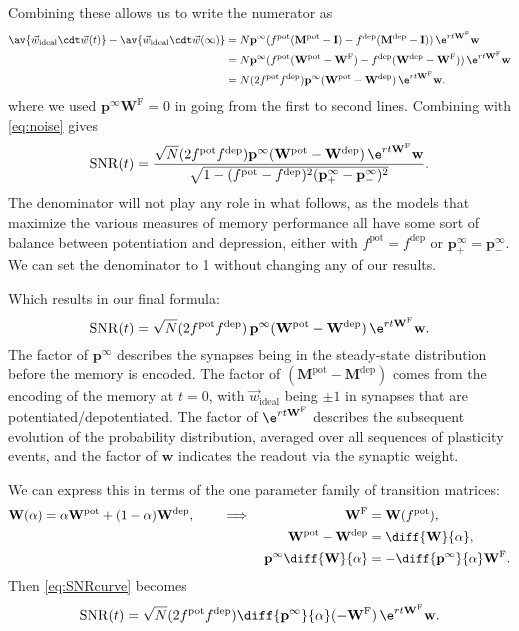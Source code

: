 \documentclass{article} %
\DeclareMathOperator{\SNR}{SNR}
\newcommand{\wv}{\vec{w}}
\newcommand{\wvi}{\vec{w}_\text{ideal}}
\newcommand{\I}{\mathbf{I}}
\newcommand{\pr}{\mathbf{p}}
\newcommand{\eq}{\pr^\infty}
\newcommand{\w}{\mathbf{w}}
\newcommand{\W}{\mathbf{W}}
\newcommand{\M}{\mathbf{M}}
\newcommand{\frg}{\W^{\mathrm{F}}}
\newcommand{\pot}{^{\text{pot}}}
\newcommand{\dep}{^{\text{dep}}}
\begin{document}
Combining these allows us to write the numerator as
%
\begin{equation}\label{eq:signal}
\begin{aligned}
  \av{\wv_\text{ideal}\cdt\wv(t)} - \av{\wv_\text{ideal}\cdt\wv(\infty)}
    &= N \eq (f\pot(\M\pot-\I)-f\dep(\M\dep-\I))\, \e^{rt\frg} \w \\
    &= N \eq (f\pot(\W\pot-\frg)-f\dep(\W\dep-\frg))\, \e^{rt\frg} \w \\
    &= N (2f\pot f\dep)\eq (\W\pot  - \W\dep )\,\e^{rt\frg}\w.
\end{aligned}
\end{equation}
%
where we used $\eq\frg=0$ in going from the first to second lines.
Combining with \eqref{eq:noise} gives
%
\begin{equation}\label{eq:SNRcurveExact}
  \SNR(t) = \frac{\sqrt{N} (2f\pot f\dep ) \eq (\W\pot  - \W\dep )\,\e^{rt\frg}\w}
                 {\sqrt{1-(f\pot-f\dep)^2(\eq_+-\eq_-)^2}}.
\end{equation}
%
The denominator will not play any role in what follows, as the models that maximize the various measures of memory performance all have some sort of balance between potentiation and depression, either with $f\pot=f\dep$ or $\eq_+=\eq_-$.
We can set the denominator to 1 without changing any of our results.

Which results in our final formula:
%
\begin{equation}\label{eq:SNRcurve}
  \SNR(t) = \sqrt{N} (2f\pot f\dep )\, \eq (\W\pot  - \W\dep )\,\e^{rt\frg}\w.
\end{equation}
%
The factor of $\eq$ describes the synapses being in the steady-state distribution before the memory is encoded. The factor of $(\M\pot-\M\dep)$ comes from the encoding of the memory at $t=0$, with $\wvi$ being $\pm1$ in synapses that are potentiated/depotentiated. The factor of $\e^{rt\frg}$ describes the subsequent evolution of the probability distribution, averaged over all sequences of plasticity events, and the factor of $\w$ indicates the readout via the synaptic weight.

We can express this in terms of the one parameter family of transition matrices:
%
\begin{equation}\label{eq:Walpha}
  \begin{aligned}
  \W(\alpha) &= \alpha\W\pot +(1-\alpha)\W\dep ,
  &\quad&\implies&
    \frg&=\W(f\pot ),\\&&&&
    \W\pot  - \W\dep  &= \diff{\W}{\alpha},\\&&&&
    \eq \diff{\W}{\alpha} &= -\diff{\eq}{\alpha} \frg.
  \end{aligned}
\end{equation}
%
Then \eqref{eq:SNRcurve} becomes
%
\begin{equation}\label{eq:SNRalpha}
  \SNR(t) = \sqrt{N} (2f\pot f\dep ) \diff{\eq}{\alpha}(-\frg)\,\e^{rt\frg}\w.
\end{equation}
%
\end{document}

